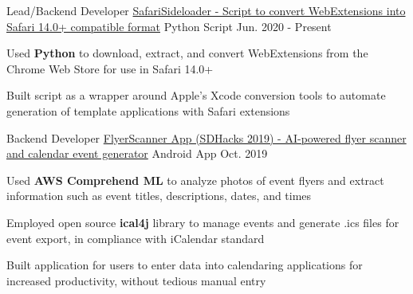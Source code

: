 
\begin{cventries}

  \cventry
    {Lead/Backend Developer} %
    {\href{https://github.com/hexalellogram/SafariSideloader}{SafariSideloader - Script to convert WebExtensions into Safari 14.0+ compatible format}} %
    {Python Script} %
    {Jun. 2020 - Present} %
    {
      \begin{cvitems} %
        \item {Used \textbf{Python} to download, extract, and convert WebExtensions from the Chrome Web Store for use in Safari 14.0+}
        \item {Built script as a wrapper around Apple's Xcode conversion tools to automate generation of template applications with Safari extensions}
      \end{cvitems}
    }

  \cventry
    {Backend Developer} %
    {\href{https://github.com/hexalellogram/FlyerScanner}{FlyerScanner App (SDHacks 2019) - AI-powered flyer scanner and calendar event generator}} %
    {Android App} %
    {Oct. 2019} %
    {
      \begin{cvitems} %
        \item {Used \textbf{AWS Comprehend ML} to analyze photos of event flyers and extract information such as event titles, descriptions, dates, and times}
        \item {Employed open source \textbf{ical4j} library to manage events and generate .ics files for event export, in compliance with iCalendar standard}
        \item {Built application for users to enter data into calendaring applications for increased productivity, without tedious manual entry}
      \end{cvitems}
    }


\end{cventries}
